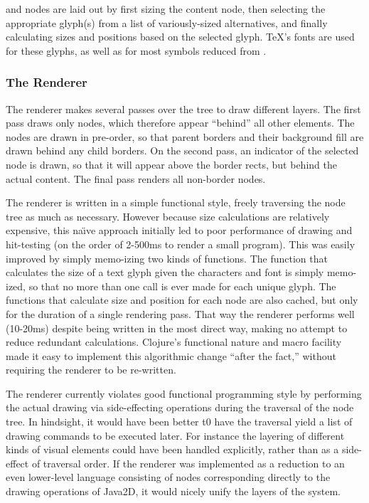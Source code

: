  and  nodes are laid out by first sizing the content node, then selecting the appropriate glyph(s) from a list of variously-sized alternatives, and finally calculating sizes and positions based on the selected glyph. \TeX's fonts are used for these glyphs, as well as for most symbols reduced from . 


\subsubsection{The Renderer}

The renderer makes several passes over the tree to draw different layers. The first pass draws only  nodes, which therefore appear ``behind'' all other elements. The nodes are drawn in pre-order, so that parent borders and their background fill are drawn behind any child borders. On the second pass, an indicator of the selected node is drawn, so that it will appear above the border rects, but behind the actual content. The final pass renders all non-border nodes.  

The renderer is written in a simple functional style, freely traversing the node tree as much as necessary. However because size calculations are relatively expensive, this na\"{\i}ve  approach initially led to poor performance of drawing and hit-testing (on the order of 2-500ms to render a small program). This was easily improved by simply memo-izing two kinds of functions. The function that calculates the size of a text glyph given the characters and font is simply memo-ized, so that no more than one call is ever made for each unique glyph. The functions that calculate size and position for each node are also cached, but only for the duration of a single rendering pass. That way the renderer performs well (10-20ms) despite being written in the most direct way, making no attempt to reduce redundant calculations. Clojure's functional nature and macro facility made it easy to implement this algorithmic change ``after the fact,'' without requiring the renderer to be re-written.

The renderer currently violates good functional programming style by performing the actual drawing via side-effecting operations during the traversal of the node tree. In hindsight, it would have been better t0 have the traversal yield a list of drawing commands to be executed later. For instance the layering of different kinds of visual elements could have been handled explicitly, rather than as a side-effect of traversal order. If the renderer was implemented as a reduction to an even lower-level language consisting of nodes corresponding directly to the drawing operations of Java2D, it would nicely unify the layers of the system.


